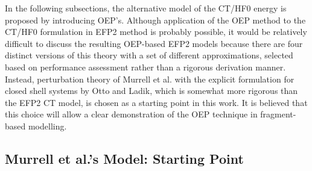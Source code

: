 In the following subsections, the alternative model of the CT/HF0 energy is proposed
by introducing OEP's. Although application of the OEP method to the CT/HF0 formulation in EFP2 method
is probably possible, it would be relatively difficult to discuss the resulting OEP\hyp{}based
EFP2 models because there are four distinct versions of this theory
with a set of different approximations, selected based on performance assessment rather than 
a rigorous derivation manner.
Instead, perturbation theory of Murrell et al.\cite{Murrell.Randic.Williams.Longuet-Higgins.ProcRSocLondA.1965} 
with the
explicit formulation for closed shell systems by Otto and Ladik\cite{Otto.Ladik.ChemPhys.1975},
which is somewhat more rigorous than the EFP2 CT model,
is chosen as a starting point in this work. 
It is believed that this choice will allow a clear demonstration 
of the OEP technique in fragment\hyp{}based modelling.


\subsection{\label{ss:3.2.OL} Murrell et al.'s Model: Starting Point}

